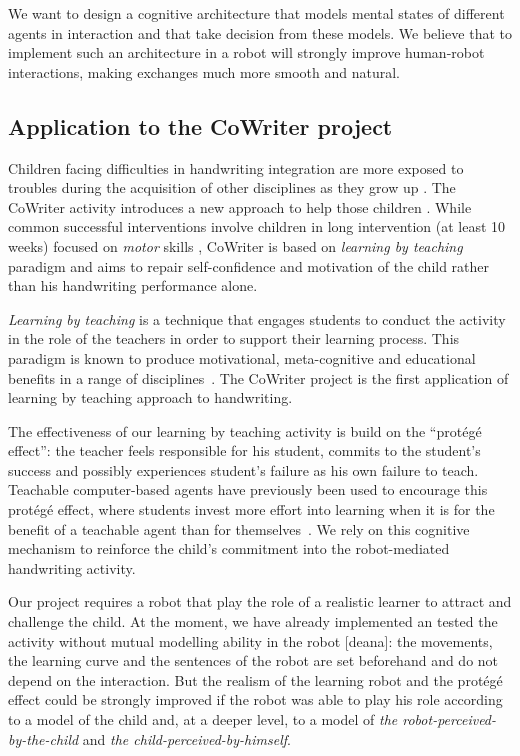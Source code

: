 \documentclass[10pt,a4paper,twocolumn]{article}
\begin{document}
We want to design a cognitive architecture that models mental states of different agents in interaction and that take decision from these models. We believe that to implement such an architecture in a robot will strongly improve human-robot interactions, making exchanges much more smooth and natural. 

\subsection{Application to the CoWriter project}
Children facing difficulties in handwriting integration are more exposed
to troubles during the acquisition of other disciplines as they grow up
\cite{Christensen2005}. 
The CoWriter activity introduces a new approach to help those children
\cite{Hood}. While common successful interventions involve children
in long intervention (at least 10 weeks) focused on \emph{motor} skills \cite{Hoy2011},
CoWriter is based on \emph{learning by teaching} paradigm and aims to repair
self-confidence and motivation of the child rather than his handwriting performance alone.

\emph{Learning by teaching} is a technique that engages students to conduct the activity in the role of the teachers in order to support their learning process. This 
paradigm is known to produce motivational, meta-cognitive and educational
benefits in a range of disciplines~\cite{Rohrbeck2003}. The CoWriter project
is the first application of learning by teaching approach to handwriting. 

The effectiveness of our learning by teaching activity is build on the
``prot\'eg\'e effect'': the teacher feels responsible for his student, commits
to the student's success and possibly experiences student's failure as his own
failure to teach. Teachable computer-based agents have previously been used to
encourage this prot\'eg\'e effect, where students invest more effort into
learning when it is for the benefit of a teachable agent than for themselves~\cite{Chase2009}.
We rely on this cognitive mechanism to reinforce the child's commitment into the
robot-mediated handwriting activity.

Our project requires a robot that play the role of a realistic learner to attract and challenge the child. At the moment, we have already implemented an tested the activity without mutual modelling ability in the robot [deana]: the movements, the learning curve and the sentences of the robot are set beforehand and do not depend on the interaction. But the realism of the learning robot and the prot\'eg\'e effect could be strongly improved if the robot was able to play his role according to a model of the child and, at a deeper level, to a model of \textit{the robot-perceived-by-the-child} and \textit{the child-perceived-by-himself}.
\end{document}
